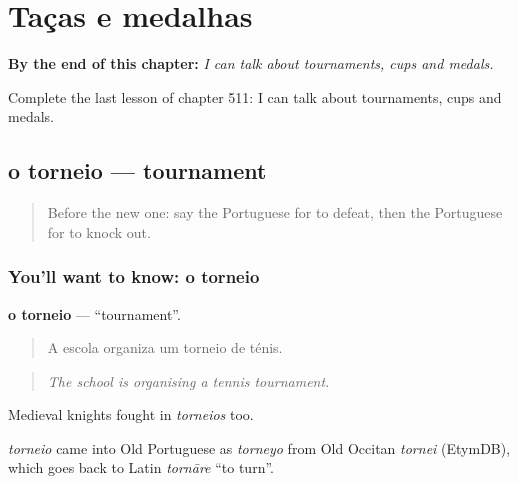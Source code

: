 
\chapter{Taças e medalhas}
\label{ch:pt-tacas-e-medalhas}

\begin{chapteropening}
\textbf{By the end of this chapter:} \emph{I can talk about tournaments, cups and medals.}

Complete the last lesson of chapter 511: I can talk about tournaments, cups and medals.
\end{chapteropening}

\section[o torneio]{o torneio — tournament}

\label{lesson:PT-C511-torneio}



\begin{quote}
Before the new one: say the Portuguese for to defeat, then the Portuguese for to knock out.
\end{quote}

\subsection*{You'll want to know: o torneio}
\textbf{o torneio} — \textquotedblleft{}tournament\textquotedblright{}.

\begin{quote}
A escola organiza um torneio de ténis.
\end{quote}

\begin{quote}
\emph{The school is organising a tennis tournament.}
\end{quote}

Medieval knights fought in \emph{torneios} too.

\begin{cousinweb}
\emph{torneio} came into Old Portuguese as \emph{torneyo} from Old Occitan \emph{tornei} (EtymDB), which goes back to Latin \emph{tornāre} \textquotedblleft{}to turn\textquotedblright{}.
\end{cousinweb}

